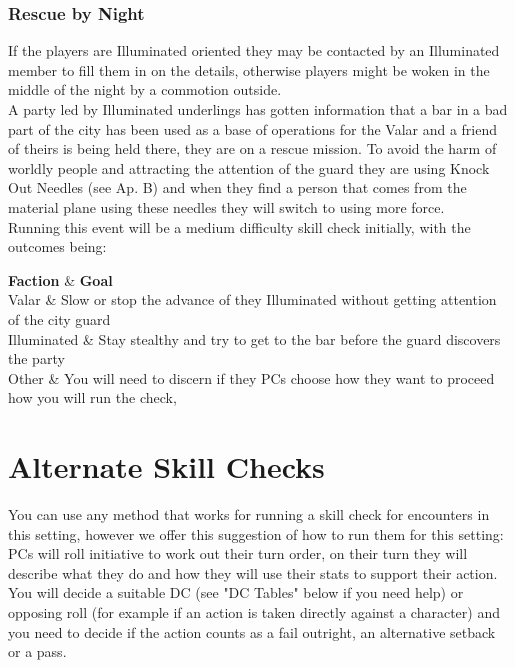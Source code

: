 \documentclass[10pt,twoside,twocolumn]{article}
\begin{document}
\subsubsection{Rescue by Night}
If the players are Illuminated oriented they may be contacted by an Illuminated member to fill them in on the details, otherwise players might be woken in the middle of the night by a commotion outside.\\

A party led by Illuminated underlings has gotten information that a bar in a bad part of the city has been used as a base of operations for the Valar and a friend of theirs is being held there, they are on a rescue mission. To avoid the harm of worldly people and attracting the attention of the guard they are using Knock Out Needles (see Ap. B) and when they find a person that comes from the material plane using these needles they will switch to using more force.\\

Running this event will be a medium difficulty skill check initially, with the outcomes being:\\

\begin{dndtable}
	\textbf{Faction}  & \textbf{Goal} \\
   	Valar & Slow or stop the advance of they Illuminated without getting attention of the city guard \\
	Illuminated & Stay stealthy and try to get to the bar before the guard discovers the party \\
	Other & You will need to discern if they PCs choose how they want to proceed how you will run the check,
\end{dndtable}

\section{Alternate Skill Checks}
You can use any method that works for running a skill check for encounters in this setting, however we offer this suggestion of how to run them for this setting:
PCs will roll initiative to work out their turn order, on their turn they will describe what they do and how they will use their stats to support their action. You will decide a suitable DC (see "DC Tables" below if you need help) or opposing roll (for example if an action is taken directly against a character) and you need to decide if the action counts as a fail outright, an alternative setback or a pass.\\
\end{document}
